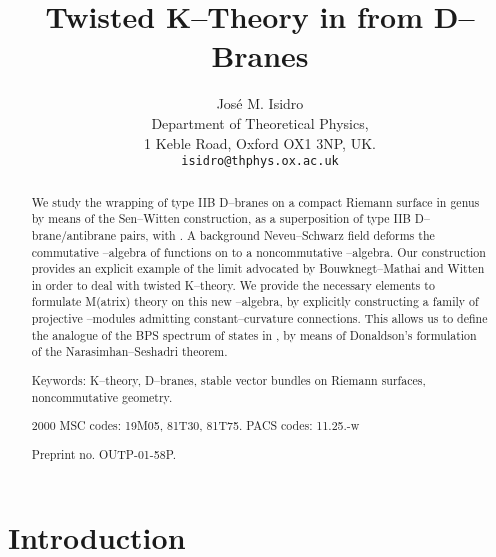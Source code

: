 \documentclass[a4paper,a4paper]{article}
\begin{document}
\title{Twisted K--Theory in \coordHE{} from D--Branes}

\author{Jos\'e M. Isidro\\
Department of Theoretical Physics,\\ 
1 Keble Road, 
Oxford OX1 3NP, UK.\\ 
{\tt isidro@thphys.ox.ac.uk}}
\maketitle

\begin{abstract}
We study the wrapping of \coordHE{} type IIB D\coordHE{}--branes on a compact Riemann 
surface \myHighlight{$\Sigma$}\coordHE{} in genus \coordHE{} by means of the Sen--Witten construction, 
as a superposition of \coordHE{} type IIB D\coordHE{}--brane/antibrane pairs, 
with \coordHE{}. A background Neveu--Schwarz field \coordHE{} deforms the commutative 
\coordHE{}--algebra of functions on \myHighlight{$\Sigma$}\coordHE{} to a noncommutative \coordHE{}--algebra.
Our construction provides an explicit example of the \coordHE{} limit 
advocated by Bouwknegt--Mathai and Witten 
in order to deal with twisted K--theory. We provide the necessary 
elements to formulate M(atrix) theory on this new \coordHE{}--algebra, by
explicitly constructing a family of projective \coordHE{}--modules admitting 
constant--curvature connections. This allows us to define the \coordHE{} analogue
of the BPS spectrum of states in \coordHE{}, by means of Donaldson's formulation 
of the Narasimhan--Seshadri theorem. 

Keywords: K--theory, D--branes, stable vector bundles on Riemann surfaces, noncommutative 
geometry.

2000 MSC codes: 19M05, 81T30, 81T75. PACS codes: 11.25.-w

Preprint no. OUTP-01-58P.

\end{abstract}

\tableofcontents

\section{Introduction}\label{intro}  
  
\end{document}
